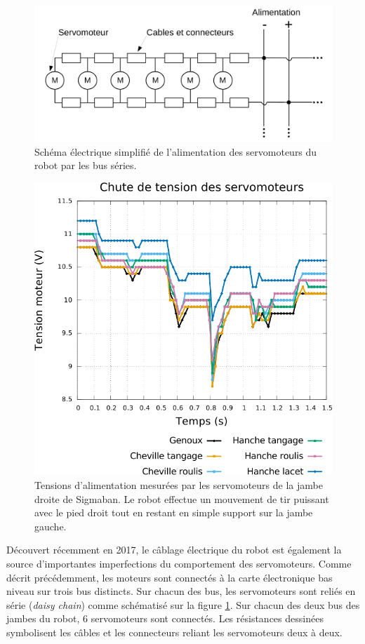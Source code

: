 \begin{figure}[htb]
    \centerfloat
    \includegraphics[type=pdf,ext=.pdf,read=.pdf,width=1.0\linewidth]{../schema/electric_bus}
    \caption{\label{fig:robot_bus} 
        Schéma électrique simplifié de l'alimentation des servomoteurs 
        du robot par les bus séries.
    }
\end{figure}

\begin{figure}[htb]
    \centerfloat
    \includegraphics[type=pdf,ext=.pdf,read=.pdf,width=0.8\linewidth]{../plot/motors_voltage}
    \caption{\label{fig:robot_voltage} 
        Tensions d'alimentation mesurées par les servomoteurs
        de la jambe droite de Sigmaban.
        Le robot effectue un mouvement de tir puissant avec le pied droit tout en restant 
        en simple support sur la jambe gauche.
    }
\end{figure}

Découvert récemment en 2017, le câblage électrique du robot est également
la source d'importantes imperfections du comportement des servomoteurs.
Comme décrit précédemment, les moteurs sont connectés à la carte
électronique bas niveau sur trois bus distincts. 
Sur chacun des bus, les servomoteurs sont reliés en série (\textit{daisy chain})
comme schématisé sur la figure \ref{fig:robot_bus}.
Sur chacun des deux bus des jambes du robot, $6$ servomoteurs sont connectés.
Les résistances dessinées symbolisent les câbles et les connecteurs reliant
les servomoteurs deux à deux.

